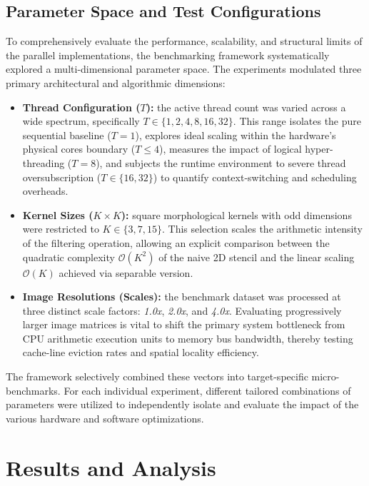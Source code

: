 \documentclass[10pt,twocolumn,letterpaper]{article}
\begin{document}
\subsection{Parameter Space and Test Configurations}
\label{subsec:parameter_space}

To comprehensively evaluate the performance, scalability, and structural limits of the parallel implementations, the benchmarking framework systematically explored a multi-dimensional parameter space. The experiments modulated three primary architectural and algorithmic dimensions:

\begin{itemize}
    \item \textbf{Thread Configuration ($T$):} the active thread count was varied across a wide spectrum, specifically $T \in \{1, 2, 4, 8, 16, 32\}$. This range isolates the pure sequential baseline ($T=1$), explores ideal scaling within the hardware's physical cores boundary ($T \le 4$), measures the impact of logical hyper-threading ($T=8$), and subjects the runtime environment to severe thread oversubscription ($T \in \{16, 32\}$) to quantify context-switching and scheduling overheads.
    
    \item \textbf{Kernel Sizes ($K \times K$):} square morphological kernels with odd dimensions were restricted to $K \in \{3, 7, 15\}$. This selection scales the arithmetic intensity of the filtering operation, allowing an explicit comparison between the quadratic complexity $\mathcal{O}(K^2)$ of the naive 2D stencil and the linear scaling $\mathcal{O}(K)$ achieved via separable version.
    
    \item \textbf{Image Resolutions (Scales):} the benchmark dataset was processed at three distinct scale factors: \textit{1.0x}, \textit{2.0x}, and \textit{4.0x}. Evaluating progressively larger image matrices is vital to shift the primary system bottleneck from CPU arithmetic execution units to memory bus bandwidth, thereby testing cache-line eviction rates and spatial locality efficiency.
\end{itemize}

The framework selectively combined these vectors into target-specific micro-benchmarks. For each individual experiment, different tailored combinations of parameters were utilized to independently isolate and evaluate the impact of the various hardware and software optimizations.


\section{Results and Analysis}
\label{sec:results}
\end{document}
